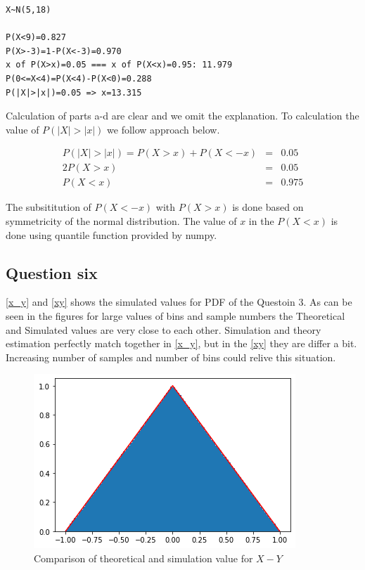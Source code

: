 \documentclass[12pt, a4paper]{book}
\begin{document}
\begin{mdframed}
\begin{verbatim}
X~N(5,18)

P(X<9)=0.827
P(X>-3)=1-P(X<-3)=0.970
x of P(X>x)=0.05 === x of P(X<x)=0.95: 11.979
P(0<=X<4)=P(X<4)-P(X<0)=0.288
P(|X|>|x|)=0.05 => x=13.315
\end{verbatim}
\end{mdframed}

Calculation of parts a-d are clear and we omit the explanation. To calculation the value of
$P(|X|>|x|)$ we follow approach below.

\begin{eqnarray*}
    P(|X|>|x|) = P(X>x) + P(X<-x) & = & 0.05 \\
    2P(X>x) & = & 0.05 \\
    P(X<x) & = & 0.975
\end{eqnarray*}

The subsititution of $P(X<-x)$ with $P(X>x)$ is done based on symmetricity of the normal distribution. The value of
$x$ in the $P(X<x)$ is done using quantile function provided by numpy.

\clearpage

\subsection*{Question six}

\autoref{x_y} and \autoref{xy} shows the simulated values for PDF of the Questoin 3. As can be seen in the
figures for large values of bins and sample numbers the Theoretical and Simulated values are very close to each
other. Simulation and theory estimation perfectly match together in \autoref{x_y}, but in the \autoref{xy}
they are differ a bit. Increasing number of samples and number of bins could relive this situation.

\begin{figure}[h]
    \centering
    \includegraphics[width=0.5\linewidth]{images/question6/x-y.png}
    \caption{Comparison of theoretical and simulation value for $X-Y$}
    \label{x_y}
\end{figure}
\end{document}
